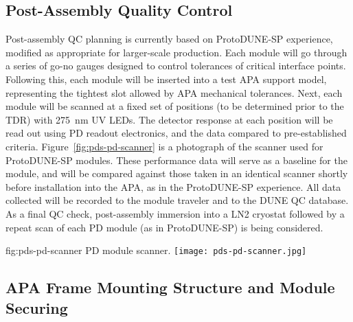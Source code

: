 


\subsection{Post-Assembly Quality Control}

Post-assembly QC planning is currently based on ProtoDUNE-SP experience, modified as appropriate for larger-scale production.  Each module will go through a series of go-no gauges designed to control tolerances of critical interface points.  Following this, each module will be inserted into a test APA support model, representing the tightest slot allowed by APA mechanical tolerances. Next, each module will be scanned at a fixed set of positions (to be determined prior to the TDR) with \SI{275}{nm} UV LEDs.  The detector response at each position will be read out using PD readout electronics, and the data compared to pre-established criteria.  Figure~\ref{fig:pds-pd-scanner} is a photograph of the scanner used for ProtoDUNE-SP modules. These performance data will serve as a baseline for the module, and will be compared against those taken in an identical scanner shortly before installation into the APA, as in the ProtoDUNE-SP experience.  All data collected will be recorded to the module traveler and to the DUNE QC database.
As a final QC check, post-assembly immersion into a LN2 cryostat followed by a repeat scan of each PD module (as in ProtoDUNE-SP) is being considered.

\begin{dunefigure}{fig:pds-pd-scanner}
{PD module scanner.}
  \texttt{[image: pds-pd-scanner.jpg]}
\end{dunefigure}




\subsection{APA Frame Mounting Structure and Module Securing}	
\label{sec:fdsp-pd-assy-frames}

